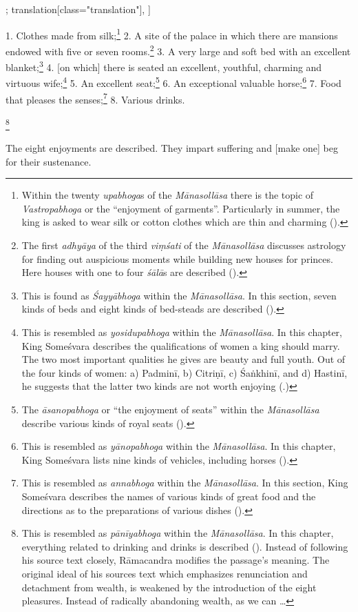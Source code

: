 \begin{alignment}[
  texts=edition[class="edition"];
  translation[class="translation"],
  ]
\begin{translation}
\begin{tlate}[p22_03]
  1. Clothes made from silk;\footnote{Within the twenty \textit{upabhoga}s of the \textit{Mānasollāsa} there is the topic of \textit{Vastropabhoga} or the ``enjoyment of garments''. Particularly in summer, the king is asked to wear silk or cotton clothes which are thin and charming (\citeauthor[1939:14]{manasollasa}).} 2. A site of the palace in which there are mansions endowed with five or seven rooms.\footnote{The first \textit{adhyāya} of the third \textit{viṃśati} of the \textit{Mānasollāsa} discusses astrology for finding out auspicious moments while building new houses for princes. Here houses with one to four \textit{śālā}s are described (\citeauthor[1939:6-7]{manasollasa}).} 3. A very large and soft bed with an excellent blanket;\footnote{This is found as \textit{Śayyābhoga} within the \textit{Mānasollāsa}. In this section, seven kinds of beds and eight kinds of bed-steads are described (\citeauthor[1939:21]{manasollasa}).} 4. [on which] there is seated an excellent, youthful, charming and virtuous wife;\footnote{This is resembled as \textit{yosidupabhoga} within the \textit{Mānasollāsa}. In this chapter, King Someśvara describes the qualifications of women a king should marry. The two most important qualities he gives are beauty and full youth. Out of the four kinds of women: a) Padminī, b) Citriṇī, c) Śaṅkhinī, and d) Hastinī, he suggests that the latter two kinds are not worth enjoying  (\citeauthor[21]{manasollasa}.)} 5. An excellent seat;\footnote{The \textit{āsanopabhoga} or ``the enjoyment of seats'' within the \textit{Mānasollāsa} describe various kinds of royal seats (\citeauthor[1939:15]{manasollasa}).} 6. An exceptional valuable horse;\footnote{This is resembled as \textit{yānopabhoga} within the \textit{Mānasollāsa}. In this chapter, King Someśvara lists nine kinds of vehicles, including horses (\citeauthor[1939:24]{manasollasa}).} 7. Food that pleases the senses;\footnote{This is resembled as \textit{annabhoga} within the \textit{Mānasollāsa}. In this section, King Someśvara describes the names of various kinds of great food and the directions as to the preparations of various dishes (\citeauthor[1939:21]{manasollasa}).} 8. Various drinks.\begin{buber}[f22_1]\footnote{This is resembled as \textit{pānīyabhoga} within the \textit{Mānasollāsa}. In this chapter, everything related to drinking and drinks is described (\citeauthor[1939:23]{manasollasa}). Instead of following his source text closely, Rāmacandra modifies the passage's meaning. The original ideal of his sources text which emphasizes renunciation and detachment from wealth, is weakened by the introduction of the eight pleasures. Instead of radically abandoning wealth, as we can \ldots}\end{buber} 
  The eight enjoyments are described. They impart suffering and [make one] beg for their sustenance.
  

\end{tlate}
\end{translation}
\end{alignment}
